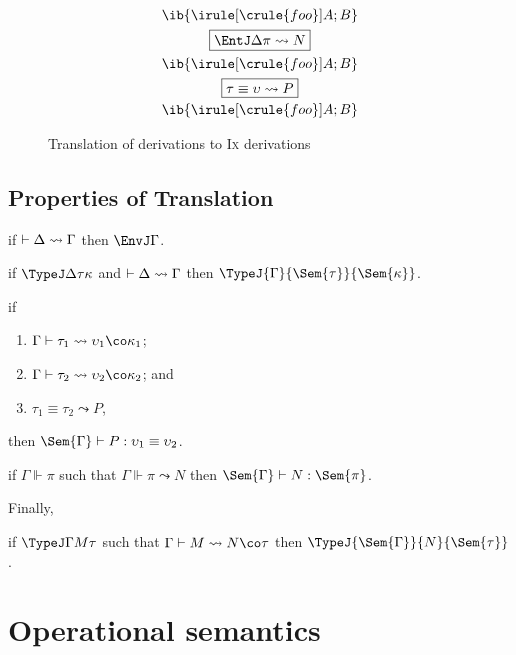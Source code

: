 \documentclass[authoryear,acmsmall,screen]{acmart}
\newcommand\SortJ[3]{\TypeJ {#1} {#2} {#3}}
\newcommand\IX{\textsc{Ix}}
\newcommand\Ixed[1]{\ensuremath{\Sem{#1}}}
\begin{document}
\begin{figure}[H]
\small
\begin{gather*}
\ib{\irule[\crule{foo}]{A};{B}} \\
\fbox{$\TransEnt \Delta \pi N$}
\\
\ib{\irule[\crule{foo}]{A};{B}}  \\
\fbox{$\TransEq \tau \upsilon P$}
\\
\ib{\irule[\crule{foo}]{A};{B}} 
\end{gather*}
\caption{Translation of \RO derivations to \IX{} derivations}
\end{figure}

\subsection{Properties of Translation}

\begin{theorem}
  if $\vdash \Delta \leadsto \Gamma$ then $\EnvJ \Gamma$.
\end{theorem}

\begin{theorem}
  if $\TypeJ \Delta \tau \kappa$ and $\vdash \Delta \leadsto \Gamma$ then $\SortJ \Gamma {\Ixed \tau} {\Ixed{\kappa}}$.
\end{theorem}

\begin{theorem}
  if
  \begin{enumerate}
  \item $\Gamma \vdash \tau_{1} \leadsto \upsilon_{1} \co \kappa_{1}$;
  \item $\Gamma \vdash \tau_{2} \leadsto \upsilon_{2} \co \kappa_{2}$; and
  \item $\tau_{1} \equiv \tau_{2} \leadsto P$,
  \end{enumerate}
 then $\Ixed{\Gamma} \vdash P : \upsilon_{1} \equiv \upsilon_{2}$.
\end{theorem}

\begin{theorem}
  if $\Gamma \Vdash \pi$ such that $\Gamma \Vdash \pi \leadsto N$ then $\Ixed{\Gamma} \vdash N : \Ixed{\pi}$.
\end{theorem}

Finally,

\begin{theorem}
  if $\TypeJ \Gamma M \tau$ such that $\Gamma \vdash M \leadsto N \co \tau$ then $\SortJ {\Ixed{\Gamma}} N {\Ixed{\tau}}$.
\end{theorem}


\section{Operational semantics}




\end{document}
